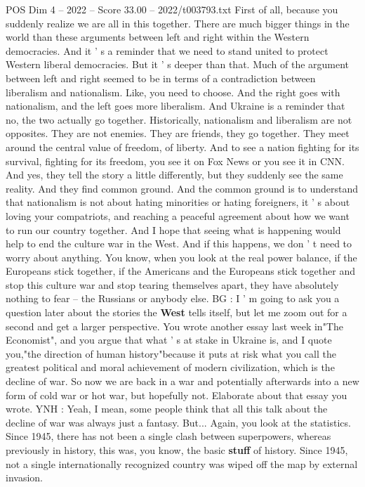\begin{textsample}{POS Dim 4 – 2022 – Score 33.00 – 2022/t003793.txt}
First of all, because you suddenly realize we are all in this together.
There are much bigger things in the world than these arguments between left and right within the Western democracies.
And it ' s a reminder that we need to stand united to protect Western liberal democracies.
But it ' s deeper than that.
Much of the argument between left and right seemed to be in terms of a contradiction between liberalism and nationalism.
Like, you need to choose.
And the right goes with nationalism, and the left goes more liberalism.
And Ukraine is a reminder that no, the two actually go together.
Historically, nationalism and liberalism are not opposites.
They are not enemies.
They are friends, they go together.
They meet around the central value of freedom, of liberty.
And to see a nation fighting for its survival, fighting for its freedom, you see it on Fox News or you see it in CNN.
And yes, they tell the story a little differently, but they suddenly see the same reality.
And they find common ground.
And the common ground is to understand that nationalism is not about hating minorities or hating foreigners, it ' s about loving your compatriots, and reaching a peaceful agreement about how we want to run our country together.
And I hope that seeing what is happening would help to end the culture war in the West.
And if this happens, we don ' t need to worry about anything.
You know, when you look at the real power balance, if the Europeans stick together, if the Americans and the Europeans stick together and stop this culture war and stop tearing themselves apart, they have absolutely nothing to fear -- the Russians or anybody else.
BG : I ' m going to ask you a question later about the stories the \textbf{West} tells itself, but let me zoom out for a second and get a larger perspective.
You wrote another essay last week in"The Economist", and you argue that what ' s at stake in Ukraine is, and I quote you,"the direction of human history"because it puts at risk what you call the greatest political and moral achievement of modern civilization, which is the decline of war.
So now we are back in a war and potentially afterwards into a new form of cold war or hot war, but hopefully not.
Elaborate about that essay you wrote.
YNH : Yeah, I mean, some people think that all this talk about the decline of war was always just a fantasy.
But...
Again, you look at the statistics.
Since 1945, there has not been a single clash between superpowers, whereas previously in history, this was, you know, the basic \textbf{stuff} of history.
Since 1945, not a single internationally recognized country was wiped off the map by external invasion.

\end{textsample}
